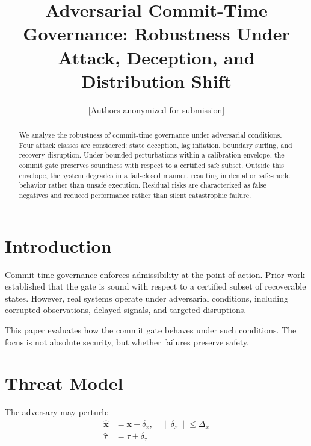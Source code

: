 \documentclass[letterpaper, 10 pt, conference]{ieeeconf}
\title{\bf Adversarial Commit-Time Governance: Robustness Under Attack, Deception, and Distribution Shift}
\author{[Authors anonymized for submission]}
\begin{document}
\maketitle
\thispagestyle{empty}
\pagestyle{empty}

\begin{abstract}
We analyze the robustness of commit-time governance under adversarial conditions. Four attack classes are considered: state deception, lag inflation, boundary surfing, and recovery disruption. Under bounded perturbations within a calibration envelope, the commit gate preserves soundness with respect to a certified safe subset. Outside this envelope, the system degrades in a fail-closed manner, resulting in denial or safe-mode behavior rather than unsafe execution. Residual risks are characterized as false negatives and reduced performance rather than silent catastrophic failure.
\end{abstract}

\section{Introduction}

Commit-time governance enforces admissibility at the point of action. Prior work established that the gate is sound with respect to a certified subset of recoverable states. However, real systems operate under adversarial conditions, including corrupted observations, delayed signals, and targeted disruptions.

This paper evaluates how the commit gate behaves under such conditions. The focus is not absolute security, but whether failures preserve safety.

\section{Threat Model}

\begin{definition}
The adversary may perturb:
\begin{align}
\hat{\mathbf{x}} &= \mathbf{x} + \delta_x, \quad \|\delta_x\| \le \Delta_x \\
\hat{\tau} &= \tau + \delta_\tau
\end{align}
\end{definition}
\end{document}
